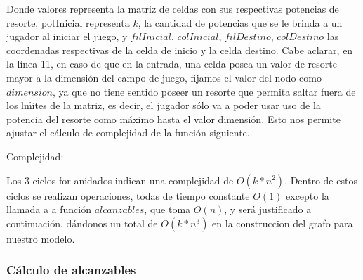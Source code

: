 Donde valores representa la matriz de celdas con sus respectivas potencias de resorte, potInicial representa $k$, la cantidad de potencias que se le brinda a un jugador al iniciar el juego, y $filInicial$, $colInicial$, $filDestino$, $colDestino$ las coordenadas respectivas de la celda de inicio y la celda destino. Cabe aclarar, en la l\'inea 11, en caso de que en la entrada, una celda posea un valor de resorte mayor a la dimensi\'on del campo de juego, fijamos el valor del nodo como $dimension$, ya que no tiene sentido poseer un resorte que permita saltar fuera de los l\'mites de la matriz, es decir, el jugador s\'olo va a poder usar uso de la potencia del resorte como m\'aximo hasta el valor dimensi\'on. Esto nos permite ajustar el c\'alculo de complejidad de la funci\'on siguiente.

\vspace{2mm}

Complejidad:

Los 3 ciclos for anidados indican una complejidad de $O(k*n^2)$. Dentro de estos ciclos se realizan operaciones, todas de tiempo constante $O(1)$ excepto la llamada a a funci\'on $alcanzables$, que toma $O(n)$, y ser\'a justificado a continuaci\'on, d\'andonos un total de $O(k*n^3)$ en la construccion del grafo para nuestro modelo.


 \subsubsection{C\'alculo de alcanzables}

